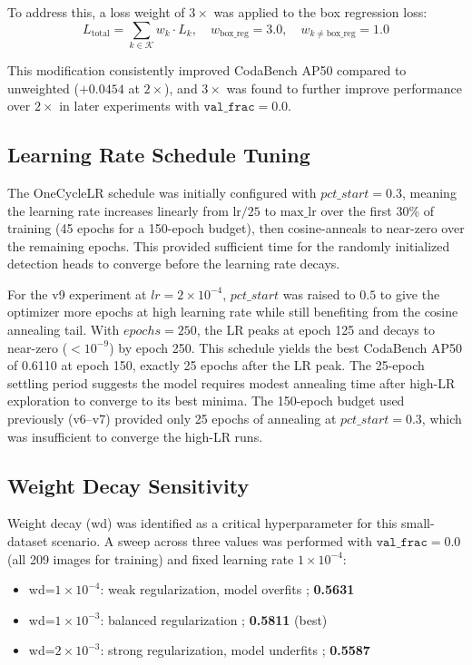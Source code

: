 \documentclass[12pt, a4paper]{article}
\begin{document}
To address this, a loss weight of $3\times$ was applied to the box regression loss:
\[
L_{\text{total}} = \sum_{k \in \mathcal{K}} w_k \cdot L_k, \quad w_{\text{box\_reg}} = 3.0, \quad w_{k \neq \text{box\_reg}} = 1.0
\]

This modification consistently improved CodaBench AP50 compared to unweighted ($+0.0454$ at $2\times$), and $3\times$ was found to further improve performance over $2\times$ in later experiments with $\texttt{val\_frac}=0.0$.

\subsection{Learning Rate Schedule Tuning}
The OneCycleLR schedule was initially configured with $pct\_start = 0.3$, meaning the learning rate increases linearly from $\text{lr}/25$ to $\text{max\_lr}$ over the first 30\% of training (45 epochs for a 150-epoch budget), then cosine-anneals to near-zero over the remaining epochs. This provided sufficient time for the randomly initialized detection heads to converge before the learning rate decays.

For the v9 experiment at $lr=2 \times 10^{-4}$, $pct\_start$ was raised to $0.5$ to give the optimizer more epochs at high learning rate while still benefiting from the cosine annealing tail. With $epochs=250$, the LR peaks at epoch 125 and decays to near-zero ($<10^{-9}$) by epoch 250. This schedule yields the best CodaBench AP50 of 0.6110 at epoch 150, exactly 25 epochs after the LR peak. The 25-epoch settling period suggests the model requires modest annealing time after high-LR exploration to converge to its best minima. The 150-epoch budget used previously (v6--v7) provided only 25 epochs of annealing at $pct\_start=0.3$, which was insufficient to converge the high-LR runs.

\subsection{Weight Decay Sensitivity}
Weight decay (wd) was identified as a critical hyperparameter for this small-dataset scenario. A sweep across three values was performed with $\texttt{val\_frac}=0.0$ (all 209 images for training) and fixed learning rate $1 \times 10^{-4}$:

\begin{itemize}
    \item wd=$1 \times 10^{-4}$: weak regularization, model overfits ; \textbf{0.5631}
    \item wd=$1 \times 10^{-3}$: balanced regularization ; \textbf{0.5811} (best)
    \item wd=$2 \times 10^{-3}$: strong regularization, model underfits ; \textbf{0.5587}
\end{itemize}
\end{document}
